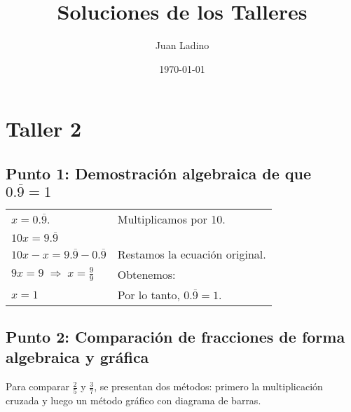 \documentclass{article}
\begin{document}
\title{Soluciones de los Talleres}
\author{Juan Ladino}
\date{\today}
\maketitle

{\tableofcontents}

\clearpage
\section{Taller 2}

\subsection{Punto 1: Demostración algebraica de que $0.\overline{9} = 1$}

\vspace{1em}
\begingroup{}
\begin{tabularx}{\textwidth}{@{}>{\raggedright\arraybackslash}p{} X@{}}
 $\displaystyle x = 0.\overline{9}$.& Multiplicamos por 10.\\[1ex]
$\displaystyle 10x = 9.\overline{9}$ & \\

$\displaystyle 10x - x = 9.\overline{9} - 0.\overline{9}$ &
Restamos la ecuación original. \\[1ex]

$\displaystyle 9x = 9 \;\Rightarrow\; x = \frac{9}{9}$ &
Obtenemos: \\[1ex]
$\displaystyle x = 1$ &
Por lo tanto, $0.\overline{9}=1$. \\[1ex]
\end{tabularx}
\endgroup

\subsection{Punto 2: Comparación de fracciones de forma algebraica y gráfica}

Para comparar $\frac{2}{5}$ y $\frac{3}{7}$, se presentan dos métodos: primero la multiplicación cruzada y luego un método gráfico con diagrama de barras.

\vspace{1em}
\end{document}
